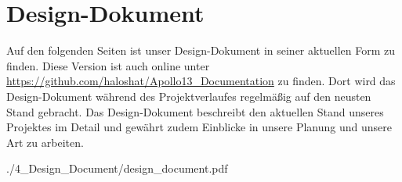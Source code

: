 \documentclass{article}
\begin{document}
\newpage
\thispagestyle{empty}
\tableofcontents
\thispagestyle{empty}
\newpage
\setcounter{page}{1}







\newpage

\section{Design-Dokument}
Auf den folgenden Seiten ist unser Design-Dokument in seiner aktuellen Form zu finden. Diese Version ist auch online unter \url{https://github.com/haloshat/Apollo13_Documentation} zu finden. Dort wird das Design-Dokument während des Projektverlaufes regelmäßig auf den neusten Stand gebracht. Das Design-Dokument beschreibt den aktuellen Stand unseres Projektes im Detail und gewährt zudem Einblicke in unsere Planung und unsere Art zu arbeiten.

{./4_Design_Document/design_document.pdf}
\end{document}
